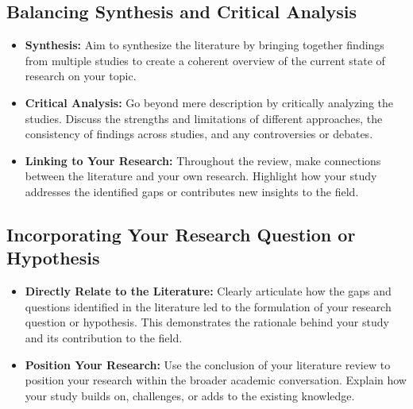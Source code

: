 \documentclass[
]{book}
\providecommand{\tightlist}{%
  \setlength{\itemsep}{0pt}\setlength{\parskip}{0pt}}
\begin{document}
\hypertarget{balancing-synthesis-and-critical-analysis}{%
\subsection*{Balancing Synthesis and Critical Analysis}\label{balancing-synthesis-and-critical-analysis}}

\begin{itemize}
\tightlist
\item
  \textbf{Synthesis:} Aim to synthesize the literature by bringing together findings from multiple studies to create a coherent overview of the current state of research on your topic.
\item
  \textbf{Critical Analysis:} Go beyond mere description by critically analyzing the studies. Discuss the strengths and limitations of different approaches, the consistency of findings across studies, and any controversies or debates.
\item
  \textbf{Linking to Your Research:} Throughout the review, make connections between the literature and your own research. Highlight how your study addresses the identified gaps or contributes new insights to the field.
\end{itemize}

\hypertarget{incorporating-your-research-question-or-hypothesis}{%
\subsection*{Incorporating Your Research Question or Hypothesis}\label{incorporating-your-research-question-or-hypothesis}}

\begin{itemize}
\tightlist
\item
  \textbf{Directly Relate to the Literature:} Clearly articulate how the gaps and questions identified in the literature led to the formulation of your research question or hypothesis. This demonstrates the rationale behind your study and its contribution to the field.
\item
  \textbf{Position Your Research:} Use the conclusion of your literature review to position your research within the broader academic conversation. Explain how your study builds on, challenges, or adds to the existing knowledge.
\end{itemize}
\end{document}
